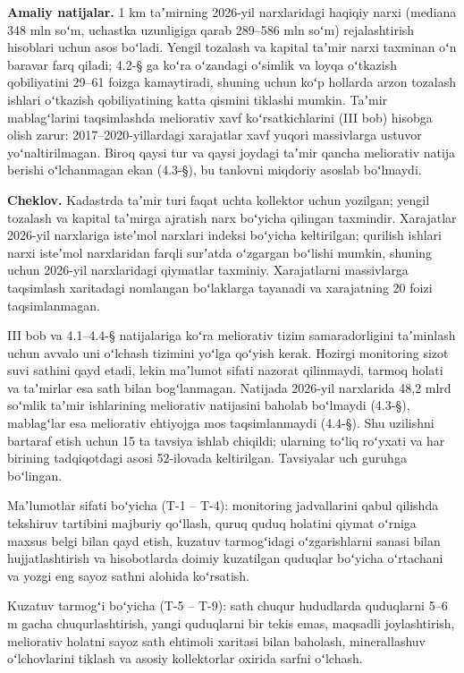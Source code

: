\textbf{Amaliy natijalar.} 1 km taʼmirning 2026-yil narxlaridagi haqiqiy
narxi (mediana 348 mln soʻm, uchastka uzunligiga qarab 289--586 mln
soʻm) rejalashtirish hisoblari uchun asos boʻladi. Yengil tozalash va
kapital taʼmir narxi taxminan oʻn baravar farq qiladi; 4.2-§ ga koʻra
oʻzandagi oʻsimlik va loyqa oʻtkazish qobiliyatini 29--61 foizga
kamaytiradi, shuning uchun koʻp hollarda arzon tozalash ishlari
oʻtkazish qobiliyatining katta qismini tiklashi mumkin. Taʼmir
mablagʻlarini taqsimlashda meliorativ xavf koʻrsatkichlarini (III bob)
hisobga olish zarur: 2017--2020-yillardagi xarajatlar xavf yuqori
massivlarga ustuvor yoʻnaltirilmagan. Biroq qaysi tur va qaysi joydagi
taʼmir qancha meliorativ natija berishi oʻlchanmagan ekan (4.3-§), bu
tanlovni miqdoriy asoslab boʻlmaydi.

\textbf{Cheklov.} Kadastrda taʼmir turi faqat uchta kollektor uchun
yozilgan; yengil tozalash va kapital taʼmirga ajratish narx boʻyicha
qilingan taxmindir. Xarajatlar 2026-yil narxlariga isteʼmol narxlari
indeksi boʻyicha keltirilgan; qurilish ishlari narxi isteʼmol
narxlaridan farqli surʼatda oʻzgargan boʻlishi mumkin, shuning uchun
2026-yil narxlaridagi qiymatlar taxminiy. Xarajatlarni massivlarga
taqsimlash xaritadagi nomlangan boʻlaklarga tayanadi va xarajatning 20
foizi taqsimlanmagan.


III bob va 4.1--4.4-§ natijalariga koʻra meliorativ tizim
samaradorligini taʼminlash uchun avvalo uni oʻlchash tizimini yoʻlga
qoʻyish kerak. Hozirgi monitoring sizot suvi sathini qayd etadi, lekin
maʼlumot sifati nazorat qilinmaydi, tarmoq holati va taʼmirlar esa sath
bilan bogʻlanmagan. Natijada 2026-yil narxlarida 48,2 mlrd soʻmlik
taʼmir ishlarining meliorativ natijasini baholab boʻlmaydi (4.3-§),
mablagʻlar esa meliorativ ehtiyojga mos taqsimlanmaydi (4.4-§). Shu
uzilishni bartaraf etish uchun 15 ta tavsiya ishlab chiqildi; ularning
toʻliq roʻyxati va har birining tadqiqotdagi asosi 52-ilovada
keltirilgan. Tavsiyalar uch guruhga boʻlingan.

Maʼlumotlar sifati boʻyicha (T-1 -- T-4): monitoring jadvallarini qabul
qilishda tekshiruv tartibini majburiy qoʻllash, quruq quduq holatini
qiymat oʻrniga maxsus belgi bilan qayd etish, kuzatuv tarmogʻidagi
oʻzgarishlarni sanasi bilan hujjatlashtirish va hisobotlarda doimiy
kuzatilgan quduqlar boʻyicha oʻrtachani va yozgi eng sayoz sathni
alohida koʻrsatish.

Kuzatuv tarmogʻi boʻyicha (T-5 -- T-9): sath chuqur hududlarda
quduqlarni 5--6 m gacha chuqurlashtirish, yangi quduqlarni bir tekis
emas, maqsadli joylashtirish, meliorativ holatni sayoz sath ehtimoli
xaritasi bilan baholash, minerallashuv oʻlchovlarini tiklash va asosiy
kollektorlar oxirida sarfni oʻlchash.

